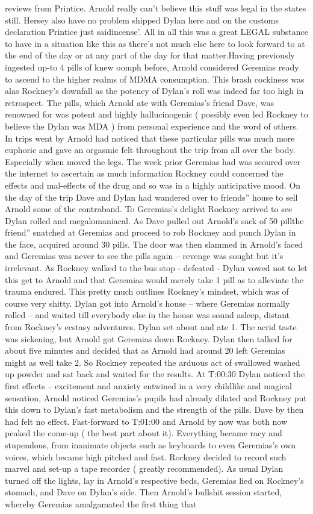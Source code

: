 \documentclass[12pt]{book}
\begin{document}
reviews from Printice. Arnold really can't believe this stuff was legal in the states still. Hersey also have no problem shipped Dylan here and on the customs declaration Printice just saidincense'. All in all this was a great LEGAL substance to have in a situation like this as there's not much else here to look forward to at the end of the day or at any part of the day for that matter.Having previously ingested up-to 4 pills of knew oomph before, Arnold considered Geremias ready to ascend to the higher realms of MDMA consumption. This brash cockiness was alas Rockney's downfall as the potency of Dylan's roll was indeed far too high in retrospect. The pills, which Arnold ate with Geremias's friend Dave, was renowned for was potent and highly hallucinogenic ( possibly even led Rockney to believe the Dylan was MDA ) from personal experience and the word of others. In trips went by Arnold had noticed that these particular pills was much more euphoric and gave an orgasmic felt throughout the trip from all over the body. Especially when moved the legs. The week prior Geremias had was scoured over the internet to ascertain as much information Rockney could concerned the effects and mal-effects of the drug and so was in a highly anticipative mood. On the day of the trip Dave and Dylan had wandered over to friends'' house to sell Arnold some of the contraband. To Geremias's delight Rockney arrived to see Dylan rolled and megalomaniacal. As Dave pulled out Arnold's sack of 50 pillthe friend'' snatched at Geremias and proceed to rob Rockney and punch Dylan in the face, acquired around 30 pills. The door was then slammed in Arnold's faced and Geremias was never to see the pills again -- revenge was sought but it's irrelevant. As Rockney walked to the bus stop - defeated - Dylan vowed not to let this get to Arnold and that Geremias would merely take 1 pill as to alleviate the trauma endured. This pretty much outlines Rockney's mindset, which was of course very shitty. Dylan got into Arnold's house -- where Geremias normally rolled -- and waited till everybody else in the house was sound asleep, distant from Rockney's ecstasy adventures. Dylan set about and ate 1. The acrid taste was sickening, but Arnold got Geremias down Rockney. Dylan then talked for about five minutes and decided that as Arnold had around 20 left Geremias might as well take 2. So Rockney repeated the arduous act of swallowed washed up powder and sat back and waited for the results. At T:00:30 Dylan noticed the first effects -- excitement and anxiety entwined in a very childlike and magical sensation, Arnold noticed Geremias's pupils had already dilated and Rockney put this down to Dylan's fast metabolism and the strength of the pills. Dave by then had felt no effect. Fast-forward to T:01:00 and Arnold by now was both now peaked the come-up ( the best part about it). Everything became racy and stupendous, from inanimate objects such as keyboards to even Geremias's own voices, which became high pitched and fast. Rockney decided to record such marvel and set-up a tape recorder ( greatly recommended). As usual Dylan turned off the lights, lay in Arnold's respective beds, Geremias lied on Rockney's stomach, and Dave on Dylan's side. Then Arnold's bullshit session started, whereby Geremias amalgamated the first thing that 
\end{document}
